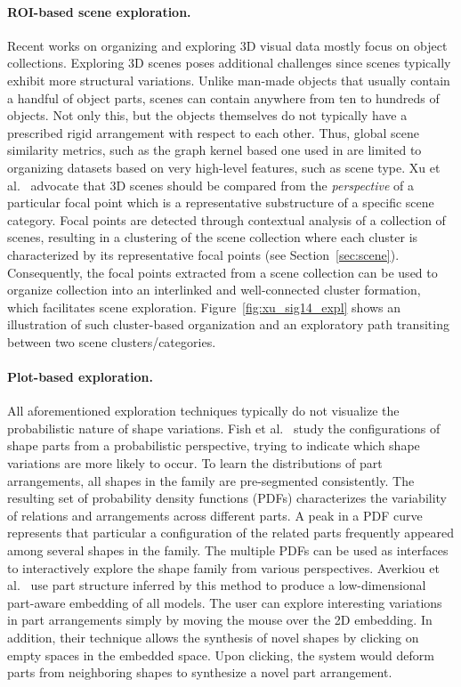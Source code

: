 \paragraph*{ROI-based scene exploration.}
Recent works on organizing and exploring 3D visual data mostly focus on object collections. Exploring 3D scenes poses additional challenges since scenes typically exhibit more structural variations. Unlike man-made objects that usually contain a handful of object parts, scenes can contain anywhere from ten to hundreds of objects.  Not only this, but the objects themselves do not typically have a prescribed rigid arrangement with respect to each other. Thus, global scene similarity metrics, such as the graph kernel based one used in \cite{Fisher:2012:CSR} are limited to organizing datasets based on very high-level features, such as scene type.
%
Xu et al.~\cite{Xu:2014:OHSC} advocate that 3D scenes should be compared from the \emph{perspective} of a particular focal point which is a representative substructure of a specific scene category. Focal points are detected through contextual analysis of a collection of scenes, resulting in a clustering
of the scene collection where each cluster is characterized by its representative focal points (see Section~\ref{sec:scene}).
%
Consequently, the focal points extracted from a scene collection can be used to organize collection into an interlinked and well-connected cluster
formation, which facilitates scene exploration. Figure~\ref{fig:xu_sig14_expl} shows an illustration of such cluster-based organization
and an exploratory path transiting between two scene clusters/categories.



\paragraph*{Plot-based exploration.}
All aforementioned exploration techniques typically do not visualize the probabilistic nature of shape variations.  Fish et al.~\cite{Fish:2014:MR} study the configurations of shape parts from a probabilistic perspective, trying to indicate which shape variations are more likely to occur.  To learn the distributions of part arrangements, all shapes in the family are pre-segmented consistently.
The resulting set of probability density functions (PDFs) characterizes the variability of relations and arrangements across different parts. A peak in a PDF curve represents that particular a configuration of the related parts frequently appeared among several shapes in the family. The multiple PDFs can be used as interfaces to interactively explore the shape family from various perspectives.
Averkiou et al.~\cite{Averkiou:2014:spm} use part structure inferred by this method to produce a low-dimensional part-aware embedding of all models. The user can explore interesting variations in part arrangements simply by moving the mouse over the 2D embedding. In addition, their technique allows the synthesis of novel shapes by clicking on empty spaces in the embedded space.  Upon clicking, the system would deform parts from neighboring shapes to synthesize a novel part arrangement.

